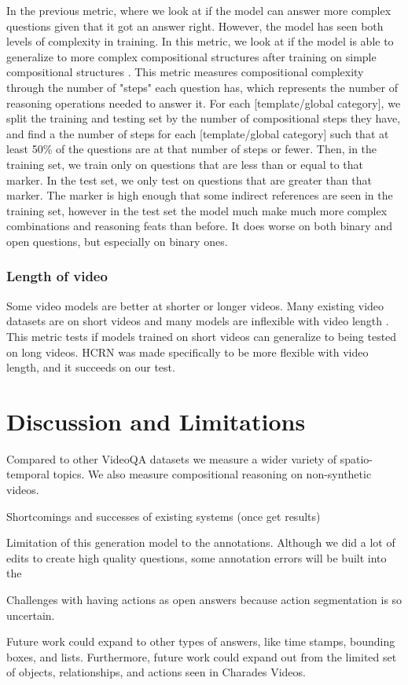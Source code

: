 \documentclass[10pt,twocolumn,letterpaper]{article}
\newcommand{\mgm}[1]{{\color{cyan}{mgm: #1}}}
\begin{document}
In the previous metric, where we look at if the model can answer more complex questions given that it got an answer right. However, the model has seen both levels of complexity in training. In this metric, we look at if the model is able to generalize to more complex compositional structures after training on simple compositional structures \cite{lake2018generalization}. This metric measures compositional complexity through the number of "steps" each question has, which represents the number of reasoning operations needed to answer it. For each [template/global category], we split the training and testing set by the number of compositional steps they have, and find a the number of steps for each [template/global category] such that at least 50\% of the questions are at that number of steps or fewer. Then, in the training set, we train only on questions that are less than or equal to that marker. In the test set, we only test on questions that are greater than that marker. The marker is high enough that some indirect references are seen in the training set, however in the test set the model much make much more complex combinations and reasoning feats than before. It does worse on both binary and open questions, but especially on binary ones.

\subsubsection{Length of video}

Some video models are better at shorter or longer videos. Many existing video datasets are on short videos and many models are inflexible with video length \cite{le2020hierarchical}. This metric tests if models trained on short videos can generalize to being tested on long videos. HCRN was made specifically to be more flexible with video length, and it succeeds on our test. 


\section{Discussion and Limitations}

\mgm{A lot of separate ideas here, need to find a coherent flow}

Compared to other VideoQA datasets we measure a wider variety of spatio-temporal topics. We also measure compositional reasoning on non-synthetic videos. 

Shortcomings and successes of existing systems (once get results)

Limitation of this generation model to the annotations. Although we did a lot of edits to create high quality questions, some annotation errors will be built into the 

Challenges with having actions as open answers because action segmentation is so uncertain.

Future work could expand to other types of answers, like time stamps, bounding boxes, and lists. Furthermore, future work could expand out from the limited set of objects, relationships, and actions seen in Charades Videos. 

{\small


}
\end{document}
